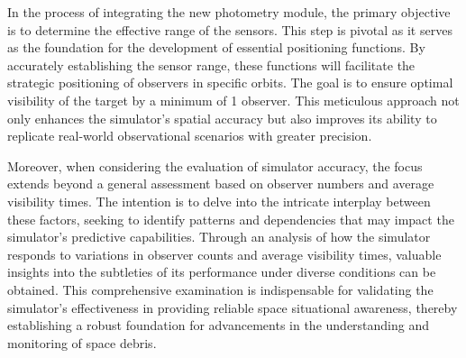 In the process of integrating the new photometry module, the primary objective is to determine the effective range of the sensors. This step is pivotal as it serves as the foundation for the development of essential positioning functions. By accurately establishing the sensor range, these functions will facilitate the strategic positioning of observers in specific orbits. The goal is to ensure optimal visibility of the target by a minimum of 1 observer. This meticulous approach not only enhances the simulator's spatial accuracy but also improves its ability to replicate real-world observational scenarios with greater precision.

Moreover, when considering the evaluation of simulator accuracy, the focus extends beyond a general assessment based on observer numbers and average visibility times. The intention is to delve into the intricate interplay between these factors, seeking to identify patterns and dependencies that may impact the simulator's predictive capabilities. Through an analysis of how the simulator responds to variations in observer counts and average visibility times, valuable insights into the subtleties of its performance under diverse conditions can be obtained. This comprehensive examination is indispensable for validating the simulator's effectiveness in providing reliable space situational awareness, thereby establishing a robust foundation for advancements in the understanding and monitoring of space debris.


